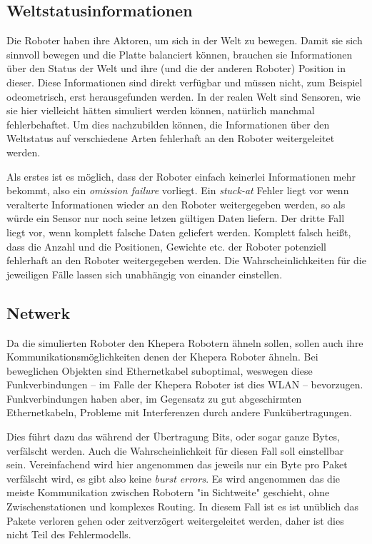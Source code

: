 \subsection{Weltstatusinformationen}
Die Roboter haben ihre Aktoren, um sich in der Welt zu bewegen. Damit sie sich sinnvoll bewegen und die
Platte balanciert k{\"{o}}nnen, brauchen sie Informationen {\"{u}}ber den Status der Welt und ihre
(und die der anderen Roboter) Position in dieser. Diese Informationen sind direkt verf{\"{u}}gbar
und m{\"{u}}ssen nicht, zum Beispiel odeometrisch, erst herausgefunden werden. In der realen Welt sind
Sensoren, wie sie hier vielleicht h{\"{a}}tten simuliert werden k{\"{o}}nnen, nat{\"{u}}rlich manchmal 
fehlerbehaftet. Um dies nachzubilden k{\"{o}}nnen, die Informationen {\"{u}}ber den Weltstatus auf
verschiedene Arten fehlerhaft an den Roboter weitergeleitet werden.

Als erstes ist es m{\"{o}}glich, dass der Roboter einfach keinerlei Informationen mehr bekommt, also ein \textit{omission failure} vorliegt. Ein \textit{stuck-at} Fehler liegt
vor wenn veralterte Informationen wieder an den Roboter weitergegeben werden, so als w{\"{u}}rde ein Sensor nur noch seine letzen g{\"{u}}ltigen Daten liefern. Der dritte
Fall liegt vor, wenn komplett falsche Daten geliefert werden. Komplett falsch hei{\ss}t, dass die Anzahl und die Positionen, Gewichte etc. der Roboter potenziell fehlerhaft an
den Roboter weitergegeben werden. Die Wahrscheinlichkeiten f{\"{u}}r die jeweiligen F{\"{a}}lle lassen sich unabh{\"{a}}ngig von einander einstellen.

\subsection{Netwerk}
Da die simulierten Roboter den Khepera Robotern {\"{a}}hneln sollen, sollen auch ihre 
Kommunikationsm{\"{o}}glichkeiten denen der Khepera Roboter {\"{a}}hneln. Bei beweglichen
Objekten sind Ethernetkabel suboptimal, weswegen diese Funkverbindungen -- im Falle der Khepera
Roboter ist dies WLAN -- bevorzugen. Funkverbindungen haben aber, im Gegensatz zu gut abgeschirmten
Ethernetkabeln, Probleme mit Interferenzen durch andere Funk{\"{u}}bertragungen.

Dies f{\"{u}}hrt dazu das w{\"{a}}hrend der {\"{U}}bertragung Bits, oder sogar ganze Bytes, verf{\"{a}}lscht werden. Auch die Wahrscheinlichkeit f{\"{u}}r diesen Fall
soll einstellbar sein. Vereinfachend wird hier angenommen das jeweils nur ein Byte pro Paket verf{\"{a}}lscht wird, es gibt also keine \textit{burst errors}.
Es wird angenommen das die meiste Kommunikation zwischen Robotern "in Sichtweite" geschieht, ohne Zwischenstationen und komplexes Routing. In diesem Fall ist
es ist un{\"{u}}blich das Pakete verloren gehen oder zeitverz{\"{o}}gert weitergeleitet werden, daher ist dies nicht Teil des Fehlermodells.

